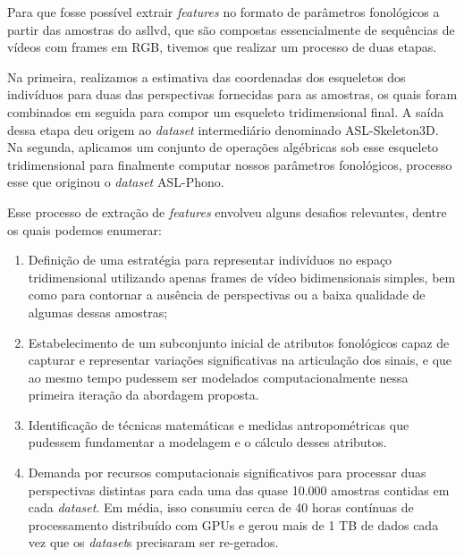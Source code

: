 Para que fosse possível extrair \textit{features} no formato de parâmetros fonológicos a partir das amostras do \acrshort{asllvd}, que são compostas essencialmente de sequências de vídeos com frames em RGB, tivemos que realizar um processo de duas etapas.

Na primeira, realizamos a estimativa das coordenadas dos esqueletos dos indivíduos para duas das perspectivas fornecidas para as amostras, os quais foram combinados em seguida para compor um esqueleto tridimensional final. A saída dessa etapa deu origem ao \textit{dataset} intermediário denominado ASL-Skeleton3D. 
Na segunda, aplicamos um conjunto de operações algébricas sob esse esqueleto tridimensional para finalmente computar nossos parâmetros fonológicos, processo esse que originou o \textit{dataset} ASL-Phono.


Esse processo de extração de \textit{features} envolveu alguns desafios relevantes, dentre os quais podemos enumerar:

\begin{enumerate}
    \item Definição de uma estratégia para representar indivíduos no espaço tridimensional utilizando apenas frames de vídeo bidimensionais simples, bem como para contornar a ausência de perspectivas ou a baixa qualidade de algumas dessas amostras;

    \item Estabelecimento de um subconjunto inicial de atributos fonológicos capaz de capturar e representar variações significativas na articulação dos sinais, e que ao mesmo tempo pudessem ser modelados computacionalmente nessa primeira iteração da abordagem proposta.

    \item Identificação de técnicas matemáticas e medidas antropométricas que pudessem fundamentar a modelagem e o cálculo desses atributos.

    \item Demanda por recursos computacionais significativos para processar duas perspectivas distintas para cada uma das quase 10.000 amostras contidas em cada \textit{dataset}. Em média, isso consumiu cerca de 40 horas contínuas de processamento distribuído com GPUs e gerou mais de 1 TB de dados cada vez que os \textit{dataset}s precisaram ser re-gerados.
\end{enumerate}





